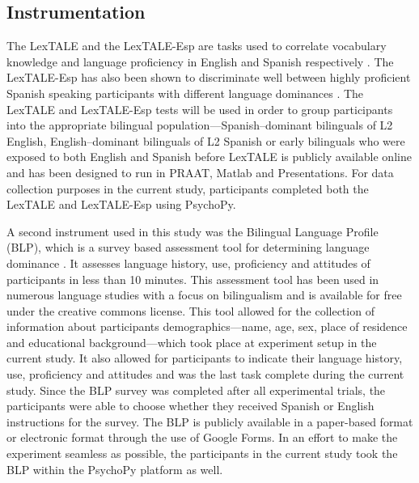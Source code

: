 \documentclass[
12pt, %
english, %
doublespacing, %
nolistspacing, %
liststotoc, %
headsepline, %
chapterinoneline, %
openany, %
]{DoctoralThesis}\usepackage[]{graphicx}\usepackage[]{color}
\begin{document}

\subsection{Instrumentation}
The LexTALE and the LexTALE-Esp are tasks used to correlate vocabulary knowledge and language proficiency in English and Spanish respectively \citep{Izura2014-yw,Lemhofer2012-hz}. The LexTALE-Esp has also been shown to discriminate well between highly proficient Spanish speaking participants with different language dominances \citep{Ferre2017-jq}. The LexTALE and LexTALE-Esp tests will be used in order to group participants into the appropriate bilingual population—Spanish–dominant bilinguals of L2 English, English–dominant bilinguals of L2 Spanish or early bilinguals who were exposed to both English and Spanish before %
LexTALE is publicly available online and has been designed to run in PRAAT, Matlab and Presentations. For data collection purposes in the current study, participants completed both the LexTALE and LexTALE-Esp using PsychoPy. 

A second instrument used in this study was the Bilingual Language Profile (BLP), which is a survey based assessment tool for determining language dominance \citep{Birdsong2012-wd}. It assesses language history, use, proficiency and attitudes of participants in less than 10 minutes. This assessment tool has been used in numerous language studies with a focus on bilingualism and is available for free under the creative commons license. This tool allowed for the collection of information about participants demographics---name, age, sex, place of residence and educational background---which took place at experiment setup in the current study. It also allowed for participants to indicate their language history, use, proficiency and attitudes and was the last task complete during the current study. Since the BLP survey was completed after all experimental trials, the participants were able to choose whether they received Spanish or English instructions for the survey. The BLP is publicly available in a paper-based format or electronic format through the use of Google Forms. In an effort to make the experiment seamless as possible, the participants in the current study took the BLP within the PsychoPy platform as well. 
\end{document}
